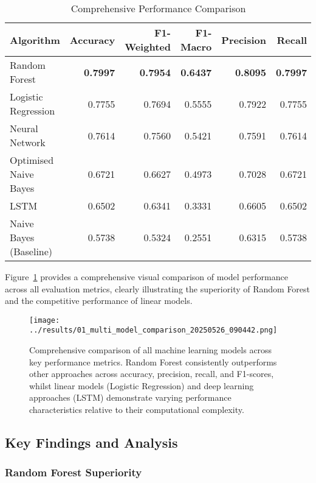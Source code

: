 \documentclass[11pt,a4paper]{article}
\begin{document}
\begin{table}[H]
    \centering
    \caption{Comprehensive Performance Comparison}
    \label{tab:results}
    \begin{tabular}{@{}lrrrrr@{}}
        \toprule
        \textbf{Algorithm} & \textbf{Accuracy} & \textbf{F1-Weighted} & \textbf{F1-Macro} & \textbf{Precision} & \textbf{Recall} \\
        \midrule
        Random Forest & \textbf{0.7997} & \textbf{0.7954} & \textbf{0.6437} & \textbf{0.8095} & \textbf{0.7997} \\
        Logistic Regression & 0.7755 & 0.7694 & 0.5555 & 0.7922 & 0.7755 \\
        Neural Network & 0.7614 & 0.7560 & 0.5421 & 0.7591 & 0.7614 \\
        Optimised Naive Bayes & 0.6721 & 0.6627 & 0.4973 & 0.7028 & 0.6721 \\
        LSTM & 0.6502 & 0.6341 & 0.3331 & 0.6605 & 0.6502 \\
        Naive Bayes (Baseline) & 0.5738 & 0.5324 & 0.2551 & 0.6315 & 0.5738 \\
        \bottomrule
    \end{tabular}
\end{table}

Figure~\ref{fig:model_comparison} provides a comprehensive visual comparison of model performance across all evaluation metrics, clearly illustrating the superiority of Random Forest and the competitive performance of linear models.

\begin{figure}[H]
    \centering
    \texttt{[image: ../results/01\_multi\_model\_comparison\_20250526\_090442.png]}
    \caption{Comprehensive comparison of all machine learning models across key performance metrics. Random Forest consistently outperforms other approaches across accuracy, precision, recall, and F1-scores, whilst linear models (Logistic Regression) and deep learning approaches (LSTM) demonstrate varying performance characteristics relative to their computational complexity.}
    \label{fig:model_comparison}
\end{figure}

\subsection{Key Findings and Analysis}

\subsubsection{Random Forest Superiority}
\end{document}
